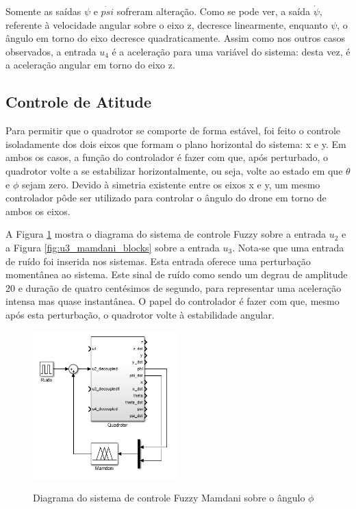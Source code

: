 Somente as saídas $\psi$ e $\dot{psi}$ sofreram alteração. Como se pode ver, a saída $\dot{\psi}$, referente à velocidade angular sobre o eixo z, decresce linearmente, enquanto $\psi$, o ângulo em torno do eixo decresce quadraticamente. Assim como nos outros casos observados, a entrada $u_4$ é a aceleração para uma variável do sistema: desta vez, é a aceleração angular em torno do eixo z.

\subsection{Controle de Atitude}
\label{subsec:controle_atitude}

Para permitir que o quadrotor se comporte de forma estável, foi feito o controle isoladamente dos dois eixos que formam o plano horizontal do sistema: x e y. Em ambos os casos, a função do controlador é fazer com que, após perturbado, o quadrotor volte a se estabilizar horizontalmente, ou seja, volte ao estado em que $\theta$ e $\phi$ sejam zero. Devido à simetria existente entre os eixos x e y, um mesmo controlador pôde ser utilizado para controlar o ângulo do drone em torno de ambos os eixos.

A Figura \ref{fig:u2_mamdani_blocks} mostra o diagrama do sistema de controle Fuzzy sobre a entrada $u_2$ e a Figura \ref{fig:u3_mamdani_blocks} sobre a entrada $u_3$. Nota-se que uma entrada de ruído foi inserida nos sistemas. Esta entrada oferece uma perturbação momentânea ao sistema. Este sinal de ruído como sendo um degrau de amplitude 20 e duração de quatro centésimos de segundo, para representar uma aceleração intensa mas quase instantânea. O papel do controlador é fazer com que, mesmo após esta perturbação, o quadrotor volte à estabilidade angular.

\begin{figure}[!htb]
    \centering
    \caption{Diagrama do sistema de controle Fuzzy Mamdani sobre o ângulo $\phi$}
    \includegraphics[width=0.5\textwidth]{./04-figuras/resultados/fis_u2/u2_mamdani_blocks}
    \label{fig:u2_mamdani_blocks}
\end{figure}

